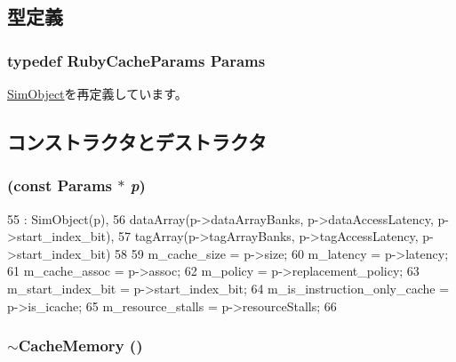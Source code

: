 \subsection{型定義}
\hypertarget{classCacheMemory_ae5279e63669c110c0bd87dca490f126d}{
\subsubsection[{Params}]{\setlength{\rightskip}{0pt plus 5cm}typedef RubyCacheParams {\bf Params}}}
\label{classCacheMemory_ae5279e63669c110c0bd87dca490f126d}


\hyperlink{classSimObject_a0f0761d2db586a23bb2a2880b8f387bb}{SimObject}を再定義しています。

\subsection{コンストラクタとデストラクタ}
\hypertarget{classCacheMemory_a6d47aa204a76f4d2c72e64478e365f80}{
\subsubsection[{CacheMemory}]{ (const {\bf Params} $\ast$ {\em p})}}
\label{classCacheMemory_a6d47aa204a76f4d2c72e64478e365f80}



\begin{DoxyCode}
55     : SimObject(p),
56     dataArray(p->dataArrayBanks, p->dataAccessLatency, p->start_index_bit),
57     tagArray(p->tagArrayBanks, p->tagAccessLatency, p->start_index_bit)
58 {
59     m_cache_size = p->size;
60     m_latency = p->latency;
61     m_cache_assoc = p->assoc;
62     m_policy = p->replacement_policy;
63     m_start_index_bit = p->start_index_bit;
64     m_is_instruction_only_cache = p->is_icache;
65     m_resource_stalls = p->resourceStalls;
66 }
\end{DoxyCode}
\hypertarget{classCacheMemory_a331251b11e8dca3018962c8209d79385}{
\subsubsection[{$\sim$CacheMemory}]{\setlength{\rightskip}{0pt plus 5cm}$\sim${\bf CacheMemory} ()}}
\label{classCacheMemory_a331251b11e8dca3018962c8209d79385}



